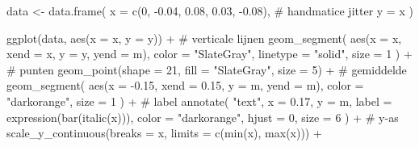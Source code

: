 \documentclass[
  a4paper,
]{scrbook}
\newenvironment{Shaded}{\begin{snugshade}}{\end{snugshade}}
\newcommand{\AttributeTok}[1]{\textcolor[rgb]{0.40,0.45,0.13}{#1}}
\newcommand{\CommentTok}[1]{\textcolor[rgb]{0.37,0.37,0.37}{#1}}
\newcommand{\DecValTok}[1]{\textcolor[rgb]{0.68,0.00,0.00}{#1}}
\newcommand{\FloatTok}[1]{\textcolor[rgb]{0.68,0.00,0.00}{#1}}
\newcommand{\FunctionTok}[1]{\textcolor[rgb]{0.28,0.35,0.67}{#1}}
\newcommand{\NormalTok}[1]{\textcolor[rgb]{0.00,0.23,0.31}{#1}}
\newcommand{\OtherTok}[1]{\textcolor[rgb]{0.00,0.23,0.31}{#1}}
\newcommand{\SpecialCharTok}[1]{\textcolor[rgb]{0.37,0.37,0.37}{#1}}
\newcommand{\StringTok}[1]{\textcolor[rgb]{0.13,0.47,0.30}{#1}}
\theoremstyle{definition}
\theoremstyle{definition}
\theoremstyle{remark}
\begin{document}
\begin{Shaded}
\begin{Highlighting}[]
\NormalTok{data }\OtherTok{\textless{}{-}} \FunctionTok{data.frame}\NormalTok{(}
  \AttributeTok{x =} \FunctionTok{c}\NormalTok{(}\DecValTok{0}\NormalTok{, }\SpecialCharTok{{-}}\FloatTok{0.04}\NormalTok{, }\FloatTok{0.08}\NormalTok{, }\FloatTok{0.03}\NormalTok{, }\SpecialCharTok{{-}}\FloatTok{0.08}\NormalTok{), }\CommentTok{\# handmatice jitter}
  \AttributeTok{y =}\NormalTok{ x}
\NormalTok{)}

\FunctionTok{ggplot}\NormalTok{(data, }\FunctionTok{aes}\NormalTok{(}\AttributeTok{x =}\NormalTok{ x, }\AttributeTok{y =}\NormalTok{ y)) }\SpecialCharTok{+}
  \CommentTok{\# verticale lijnen}
  \FunctionTok{geom\_segment}\NormalTok{(}
      \FunctionTok{aes}\NormalTok{(}\AttributeTok{x =}\NormalTok{ x, }\AttributeTok{xend =}\NormalTok{ x, }\AttributeTok{y =}\NormalTok{ y, }\AttributeTok{yend =}\NormalTok{ m), }
      \AttributeTok{color =} \StringTok{"SlateGray"}\NormalTok{, }
      \AttributeTok{linetype =} \StringTok{"solid"}\NormalTok{, }
      \AttributeTok{size =} \DecValTok{1}
\NormalTok{      ) }\SpecialCharTok{+}
  \CommentTok{\# punten}
  \FunctionTok{geom\_point}\NormalTok{(}\AttributeTok{shape =} \DecValTok{21}\NormalTok{, }\AttributeTok{fill =} \StringTok{"SlateGray"}\NormalTok{, }\AttributeTok{size =} \DecValTok{5}\NormalTok{) }\SpecialCharTok{+}
  \CommentTok{\# gemiddelde}
  \FunctionTok{geom\_segment}\NormalTok{(}
    \FunctionTok{aes}\NormalTok{(}\AttributeTok{x =} \SpecialCharTok{{-}}\FloatTok{0.15}\NormalTok{, }\AttributeTok{xend =} \FloatTok{0.15}\NormalTok{, }\AttributeTok{y =}\NormalTok{ m, }\AttributeTok{yend =}\NormalTok{ m), }
    \AttributeTok{color =} \StringTok{"darkorange"}\NormalTok{, }
    \AttributeTok{size =} \DecValTok{1}
\NormalTok{    ) }\SpecialCharTok{+}
  \CommentTok{\# label}
  \FunctionTok{annotate}\NormalTok{(}
    \StringTok{"text"}\NormalTok{, }
    \AttributeTok{x =} \FloatTok{0.17}\NormalTok{, }\AttributeTok{y =}\NormalTok{ m, }
    \AttributeTok{label =} \FunctionTok{expression}\NormalTok{(}\FunctionTok{bar}\NormalTok{(}\FunctionTok{italic}\NormalTok{(x))), }
    \AttributeTok{color =} \StringTok{"darkorange"}\NormalTok{, }
    \AttributeTok{hjust =} \DecValTok{0}\NormalTok{, }
    \AttributeTok{size =} \DecValTok{6}
\NormalTok{    ) }\SpecialCharTok{+}
  \CommentTok{\# y{-}as}
  \FunctionTok{scale\_y\_continuous}\NormalTok{(}\AttributeTok{breaks =}\NormalTok{ x, }\AttributeTok{limits =} \FunctionTok{c}\NormalTok{(}\FunctionTok{min}\NormalTok{(x), }\FunctionTok{max}\NormalTok{(x))) }\SpecialCharTok{+}

\end{Highlighting}
\end{Shaded}
\end{document}

